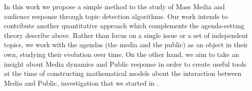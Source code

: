 \par In this work we propose a simple method to the study of Mass Media and audience response through topic detection algorithms.
Our work intends to contribute another quantitative approach which complements the agenda-setting theory describe above.
Rather than focus on a single issue or a set of independent topics, we work with the agendas (the media and the public) as an object in their own, studying their evolution over time.
On the other hand, we aim to take an insight about Media dynamics and Public response in order to create useful tools at the time of constructing mathematical models about the interaction between Media and Public, investigation that we started in \cite{pinto2016setting}.


